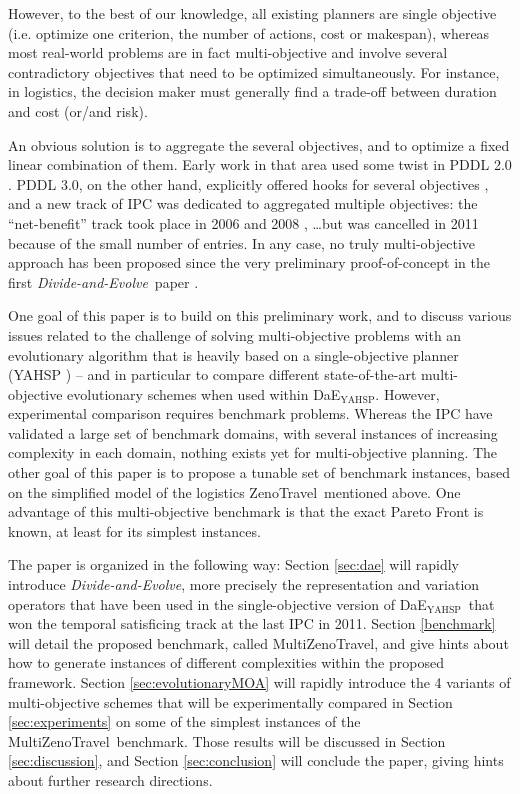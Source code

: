 \documentclass{llncs}
\def\dae{{\em Divide-and-Evolve}}
\newcommand{\DAEYAHSP}{{\sc DaE$_{\text{YAHSP}}$}}
\def\ZENO{{\sc ZenoTravel}}
\def\MULTIZENO{{\sc MultiZenoTravel}}
\begin{document}
However, to the best of our knowledge, all existing planners are single objective (i.e. optimize one criterion, the number of actions, cost or makespan), whereas most real-world problems are in fact multi-objective and involve several contradictory objectives that need to be optimized simultaneously. For instance, in logistics, the decision maker must generally find a trade-off between duration and cost (or/and risk). 

An obvious solution is to aggregate the several objectives, and to optimize a fixed linear combination of them. Early work in that area used some twist in PDDL 2.0 \cite{do2003sapa,refanidis2003multiobjective,gerevini2008}. PDDL 3.0, on the other hand, explicitly offered hooks for several objectives \cite{gerevini2006preferences}, and a new track of IPC was dedicated to aggregated multiple objectives: the ``net-benefit'' track took place in 2006 \cite{chen2006temporal} and 2008 \cite{edelkamp2009optimal}, \ldots but was cancelled in 2011 because of the small number of entries.
In any case, no truly multi-objective approach has been proposed since the very preliminary proof-of-concept in the first \dae\ paper \cite{Schoenauer2006}. 

One goal of this paper is to build on this preliminary work, and to discuss various issues related to the challenge of solving multi-objective problems with an evolutionary algorithm that is heavily based on a single-objective planner (YAHSP \cite{Vidal2004}) -- and in particular to compare different state-of-the-art multi-objective evolutionary schemes when used within \DAEYAHSP.
However, experimental comparison requires benchmark problems. Whereas the IPC have validated a large set of benchmark domains, with several instances of increasing complexity in each domain, nothing exists yet for multi-objective planning. The other goal of this paper is to propose a tunable set of benchmark instances, based on the simplified model of the logistics \ZENO\ mentioned above. One advantage of this multi-objective benchmark is that the exact Pareto Front is known, at least for its simplest instances.
 
The paper is organized in the following way: Section \ref{sec:dae} will rapidly introduce \dae, more precisely the representation and variation operators that have been used in the single-objective version of \DAEYAHSP\ that won the temporal satisficing track at the last IPC in 2011. Section \ref{benchmark} will detail the proposed benchmark, called \MULTIZENO, and give hints about how to generate instances of different complexities within the proposed framework. Section \ref{sec:evolutionaryMOA} will rapidly introduce the 4 variants of multi-objective schemes that will be experimentally compared in Section \ref{sec:experiments} on some of the simplest instances of the \MULTIZENO\ benchmark. Those results will be discussed in Section \ref{sec:discussion}, and Section \ref{sec:conclusion} will conclude the paper, giving hints about further research directions.
\end{document}
